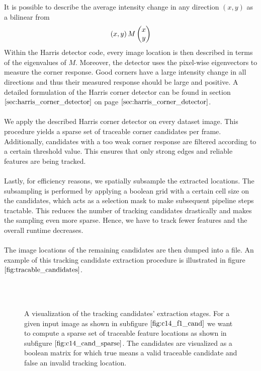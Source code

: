 It is possible to describe the average intensity change in any direction $(x,y)$
as a bilinear from
\begin{equation}
\left( x,y \right) M \colvec{x}{y}	
\end{equation}
Within the Harris detector code, every image location is then described in terms of the eigenvalues of $M$. Moreover, the detector uses the pixel-wise eigenvectors to measure the corner response. Good corners have a large intensity change in all directions and thus their measured response should be large and positive. A detailed formulation of the Harris corner detector can be found in section $\ref{sec:harris_corner_detector}$ on page $\pageref{sec:harris_corner_detector}$. \\ \\
We apply the described Harris corner detector on every dataset image. This procedure yields a sparse set of traceable corner candidates per frame. Additionally, candidates with a too weak corner response are filtered according to a certain threshold value. This ensures that only strong edges and reliable features are being tracked. \\ \\
Lastly, for efficiency reasons, we spatially subsample the extracted locations. The subsampling is performed by applying a boolean grid with a certain cell size on the candidates, which acts as a selection mask to make subsequent pipeline steps tractable. This reduces the number of tracking candidates drastically and makes the sampling even more sparse. Hence, we have to track fewer features and the overall runtime decreases. \\ \\
The image locations of the remaining candidates are then dumped into a file. An example of this tracking candidate extraction procedure is illustrated in figure $\ref{fig:tracable_candidates}$. \\ \\
\begin{figure}[H]
\begin{center}
~
\end{center}
\caption[Tracking Candidates]{A visualization of the tracking candidates' extraction stages. For a given input image as shown in subfigure $\ref{fig:c14_f1_cand}$ we want to compute a sparse set of traceable feature locations as shown in subfigure $\ref{fig:c14_cand_sparse}$. The candidates are visualized as a boolean matrix for which true means a valid traceable candidate and false an invalid tracking location.}
\label{fig:tracable_candidates}
\end{figure}
